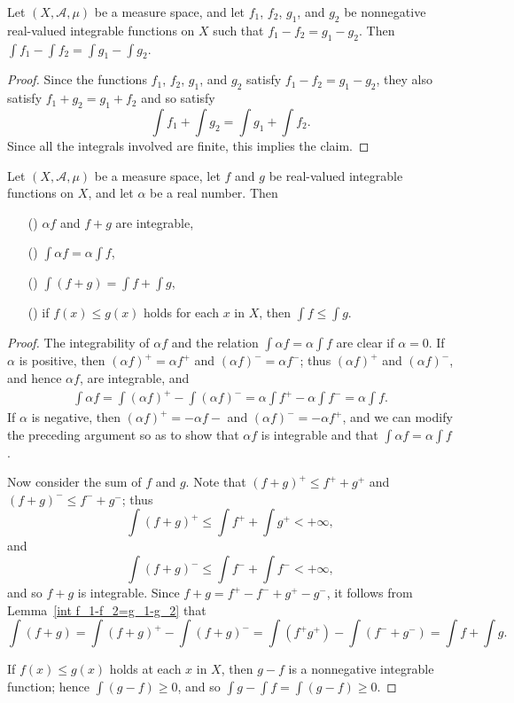 \begin{lemma}\label{int f_1-f_2=g_1-g_2}
Let $(X,\mathcal{A},\mu)$ be a measure space, and let $f_1$, $f_2$, $g_1$, and $g_2$ be nonnegative real-valued integrable functions on $X$ such that $f_1-f_2=g_1-g_2$. Then $\int f_1-\int f_2=\int g_1-\int g_2$.
\end{lemma}
\begin{proof}
Since the functions $f_1$, $f_2$, $g_1$, and $g_2$ satisfy $f_1-f_2=g_1-g_2$, they also satisfy $f_1+g_2=g_1+f_2$ and so satisfy
\[\int f_1+\int g_2=\int g_1+\int f_2.\]
Since all the integrals involved are finite, this implies the claim.
\end{proof}
\begin{proposition}\label{int prop}
Let $(X,\mathcal{A},\mu)$ be a measure space, let $f$ and $g$ be real-valued integrable functions on $X$, and let $\alpha$ be a real number. Then
\begin{itemize}
\item[(\rmnum{1})] $\alpha f$ and $f+g$ are integrable,
\item[(\rmnum{2})] $\int\alpha f=\alpha\int f$,
\item[(\rmnum{3})] $\int(f+g)=\int f+\int g$,
\item[(\rmnum{4})] if $f(x)\leq g(x)$ holds for each $x$ in $X$, then $\int f\leq\int g$.
\end{itemize}
\end{proposition}
\begin{proof}
The integrability of $\alpha f$ and the relation $\int\alpha f=\alpha\int f$ are clear if $\alpha=0$. If $\alpha$ is positive, then $(\alpha f)^+=\alpha f^+$ and $(\alpha f)^-=\alpha f^-$; thus $(\alpha f)^+$ and $(\alpha f)^-$, and hence $\alpha f$, are integrable, and
\begin{align*}
\int\alpha f=\int(\alpha f)^+-\int(\alpha f)^-=\alpha\int f^+-\alpha\int f^-=\alpha\int f.
\end{align*}
If $\alpha$ is negative, then $(\alpha f)^+=-\alpha f-$ and $(\alpha f)^-=-\alpha f^+$, and we can modify the preceding argument so as to show that $\alpha f$ is integrable and that $\int\alpha f=\alpha\int f$.\par
Now consider the sum of $f$ and $g$. Note that $(f+g)^+\leq f^++g^+$ and $(f+g)^-\leq f^-+g^-$; thus
\[\int(f+g)^+\leq\int f^++\int g^+<+\infty,\]
and
\[\int(f+g)^-\leq\int f^-+\int f^-<+\infty,\]
and so $f+g$ is integrable. Since $f+g=f^+-f^-+g^+-g^-$, it follows from Lemma~\ref{int f_1-f_2=g_1-g_2} that
\[\int(f+g)=\int(f+g)^+-\int(f+g)^-=\int(f^+g^+)-\int(f^-+g^-)=\int f+\int g.\]

If $f(x)\leq g(x)$ holds at each $x$ in $X$, then $g-f$ is a nonnegative integrable function; hence $\int(g-f)\geq 0$, and so $\int g-\int f=\int(g-f)\geq 0$.
\end{proof}
